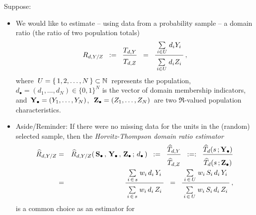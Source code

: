Suppose:
\begin{itemize}
\item
    We would like to estimate
    -- using data from a probability sample --
    a domain ratio (the ratio of two population totals)
    \begin{equation*}
    R_{d,Y/Z}
    \;\; := \;\;
        \dfrac{T_{d,Y}}{\overset{{\color{white}.}}{T_{d,Z}}}
    \;\; = \;\;
        \dfrac{
            {\color{white}.}
            \underset{i \in U}{\sum}\;d_{i}Y_{i}
            {\color{white}.}
            }{
            \overset{{\color{white}.}}{\underset{i \in U}{\sum}\;d_{i}Z_{i}}
            }\,,
    \end{equation*}
    where \,$U = \{\,1,2,\ldots,N\,\} \subset \mathbb{N}$\, represents the population,
    $d_{\bullet} = (d_{1},\ldots,d_{N}) \in \{0,1\}^{N}$ is the vector of domain membership indicators,
    and
    \,$\mathbf{Y}_{\bullet} = (Y_{1},\ldots,Y_{N})$,\,
    \,$\mathbf{Z}_{\bullet} = (Z_{1},\ldots,Z_{N})$\,
    are two $\Re$-valued population characteristics.
\item
    Aside/Reminder:
    If there were no missing data for the units in the (random) selected sample,
    then the \textit{Horvitz-Thompson domain ratio estimator}
    \begin{eqnarray*}
    \widehat{R}_{d,Y/Z}
    & = &
        \widehat{R}_{d,Y/Z}(\,
            \Sdot\,,\,
            \Ydot\,,\,
            \Zdot\,;\,
            \dbullet
            \,)
    \;\; := \;\;
        \dfrac{
            \widehat{T}_{d,Y}
            }{
            \overset{{\color{white}.}}{
                \widehat{T}_{d,Z}
                }
            }
    \;\; :=: \;\;
        \dfrac{
            \widehat{T}_{d}(s\,;\Ydot)
            }{
            \overset{{\color{white}.}}{
                \widehat{T}_{d}(s\,;\Zdot)
                }
            }
    \\
    & = &
        \dfrac{
            {\color{white}.}
            \underset{i\,\in\,s}{\sum}\;w_{i}\,d_{i}\,Y_{i}
            {\color{white}.}
            }{
            \overset{{\color{white}.}}{
                \underset{i\,\in\,s}{\sum}\;w_{i}\,d_{i}\,Z_{i}
                }
            }
    \;\; = \;\;
        \dfrac{
            {\color{white}.}
            \underset{i\,\in\,U}{\sum}\;w_{i}\,S_{i}\,d_{i}\,Y_{i}
            {\color{white}.}
            }{
            \overset{{\color{white}.}}{
                \underset{i\,\in\,U}{\sum}\;w_{i}\,S_{i}\,d_{i}\,Z_{i}
                }
            }\,,
    \end{eqnarray*}
    is a common choice as an estimator for

\end{itemize}
